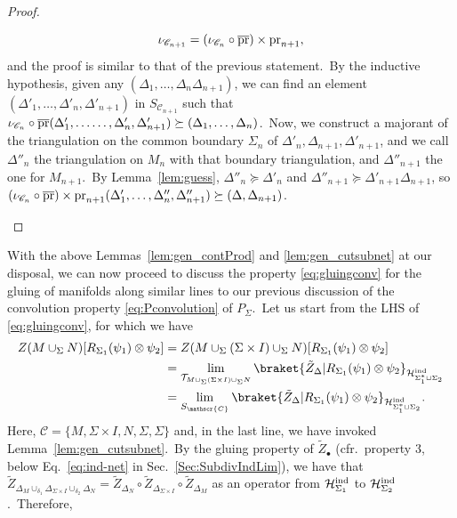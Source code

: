 \documentclass[11pt]{article}
\newcommand{\h}{\mathcal{H}}
\theoremstyle{definition}
\numberwithin{equation}{section}
\begin{document}
\begin{proof}
\begin{itemize}
    \begin{equation}
        \iota_{\mathscr{C}_{n+1}}=(\iota_{\mathscr{C}_{n}}\circ \overline{\rm pr})\times\mathrm{pr}_{n+1},
    \end{equation}
    and the proof is similar to that of the previous statement.~By the inductive hypothesis, given any $(\Delta_1,\dots,\Delta_n\Delta_{n+1})$, we can find an element $(\Delta'_1,\dots,\Delta'_n,\Delta'_{n+1})$ in $S_{\mathscr{C}_{n+1}}$ such that $\iota_{\mathscr{C}_{n}}\circ \overline{\rm pr}(\Delta'_1,\dots\allowbreak\dots,\Delta'_n,\Delta'_{n+1})\succeq (\Delta_1,\dots,\Delta_n)$.~Now, we construct a majorant of the triangulation on the common boundary $\Sigma_n$ of $\Delta'_{n},\Delta_{n+1},\Delta'_{n+1}$, and we call $\Delta''_{n}$ the triangulation on $M_n$ with that boundary triangulation, and $\Delta''_{n+1}$ the one for $M_{n+1}$.~By Lemma~\ref{lem:guess}, $\Delta''_{n}\succeq\Delta'_{n}$ and $\Delta''_{n+1}\succeq\Delta'_{n+1}\Delta_{n+1}$, so $(\iota_{\mathscr{C}_{n}}\circ \overline{\rm pr})\times \mathrm{pr}_{n+1}(\Delta'_1,\dots,\Delta''_n,\Delta''_{n+1})\succeq(\Delta,\Delta_{n+1})$.
\end{itemize}
\end{proof}
With the above Lemmas~\ref{lem:gen_contProd} and \ref{lem:gen_cutsubnet} at our disposal, we can now proceed to discuss the property \eqref{eq:gluingconv} for the gluing of manifolds along similar lines to our previous discussion of the convolution property \eqref{eq:Pconvolution} of $P_{\Sigma}$.~Let us start from the LHS of \eqref{eq:gluingconv}, for which we have
\begin{equation}
    \begin{split}
    Z(M\cup_\Sigma N)[R_{\Sigma_1}(\psi_1)\otimes\psi_2]&=Z(M\cup_{\Sigma}(\Sigma\times I)\cup_{\Sigma}N)[R_{\Sigma_1}(\psi_1)\otimes\psi_2]\\
    &=\lim_{\mathcal T_{M\cup_{\Sigma}(\Sigma\times I)\cup_{\Sigma}N}}\braket{\tilde{Z}_{\Delta}|R_{\Sigma_1}(\psi_1)\otimes\psi_2}_{\h^{\rm ind}_{\Sigma^*_1\sqcup\Sigma_2}}\\
    &=\lim_{S_{\mathscr{C}}}\braket{\tilde{Z}_{\Delta}|R_{\Sigma_1}(\psi_1)\otimes\psi_2}_{\h^{\rm ind}_{\Sigma_1^*\sqcup\Sigma_2}}.
    \end{split}
\end{equation}
Here, $\mathscr{C}=\{M,\Sigma\times I,N,\Sigma,\Sigma\}$ and, in the last line, we have invoked Lemma~\ref{lem:gen_cutsubnet}.~By the gluing property of $\tilde{Z}_{\bullet}$ (cfr.~property 3, below Eq.~\eqref{eq:ind-net} in Sec.~\ref{Sec:SubdivIndLim}), we have that $\tilde{Z}_{\Delta_M\cup_{\delta_1}\Delta_{\Sigma\times I}\cup_{\delta_2}\Delta_N}=\tilde{Z}_{\Delta_N}\circ\tilde{Z}_{\Delta_{\Sigma\times I}}\circ \tilde{Z}_{\Delta_M}$ as an operator from $\h^{\rm ind}_{\Sigma_1}$ to $\h^{\rm ind}_{\Sigma_2}$.~Therefore,
\end{document}

